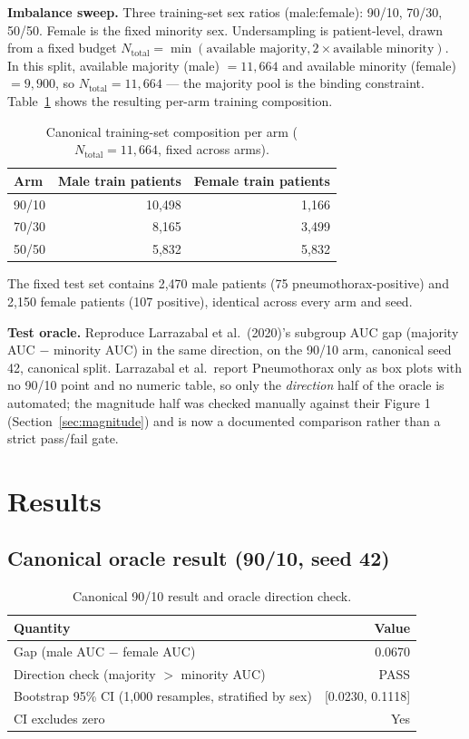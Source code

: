 \documentclass[11pt]{article}
\begin{document}
\textbf{Imbalance sweep.} Three training-set sex ratios (male:female): 90/10, 70/30, 50/50. Female is the fixed minority sex. Undersampling is patient-level, drawn from a fixed budget $N_{\text{total}} = \min(\text{available majority}, 2\times\text{available minority})$. In this split, available majority (male) $=11{,}664$ and available minority (female) $=9{,}900$, so $N_{\text{total}}=11{,}664$ — the majority pool is the binding constraint. Table~\ref{tab:composition} shows the resulting per-arm training composition.

\begin{table}[H]
\centering
\begin{tabular}{lrr}
\toprule
Arm & Male train patients & Female train patients \\
\midrule
90/10 & 10{,}498 & 1{,}166 \\
70/30 & 8{,}165 & 3{,}499 \\
50/50 & 5{,}832 & 5{,}832 \\
\bottomrule
\end{tabular}
\caption{Canonical training-set composition per arm ($N_{\text{total}}=11{,}664$, fixed across arms).}
\label{tab:composition}
\end{table}

The fixed test set contains 2{,}470 male patients (75 pneumothorax-positive) and 2{,}150 female patients (107 positive), identical across every arm and seed.

\textbf{Test oracle.} Reproduce Larrazabal et al.\ (2020)'s subgroup AUC gap (majority AUC $-$ minority AUC) in the same direction, on the 90/10 arm, canonical seed 42, canonical split. Larrazabal et al.\ report Pneumothorax only as box plots with no 90/10 point and no numeric table, so only the \emph{direction} half of the oracle is automated; the magnitude half was checked manually against their Figure 1 (Section~\ref{sec:magnitude}) and is now a documented comparison rather than a strict pass/fail gate.

\section{Results}

\subsection{Canonical oracle result (90/10, seed 42)}

\begin{table}[H]
\centering
\begin{tabular}{lr}
\toprule
Quantity & Value \\
\midrule
Gap (male AUC $-$ female AUC) & 0.0670 \\
Direction check (majority $>$ minority AUC) & PASS \\
Bootstrap 95\% CI (1{,}000 resamples, stratified by sex) & [0.0230, 0.1118] \\
CI excludes zero & Yes \\
\bottomrule
\end{tabular}
\caption{Canonical 90/10 result and oracle direction check.}
\label{tab:canonical}
\end{table}
\end{document}
